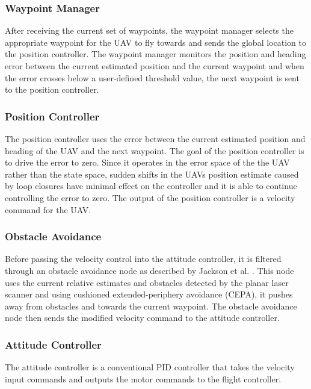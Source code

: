 \documentclass[letterpaper, 10 pt, conference]{ieeeconf}  %
\begin{document}
\subsubsection{Waypoint Manager}

After receiving the current set of waypoints, the waypoint manager selects the appropriate waypoint for the UAV to fly towards and sends the global location to the position controller. The waypoint manager monitors the position and heading error between the current estimated position and the current waypoint and when the error crosses below a user-defined threshold value, the next waypoint is sent to the position controller.

\subsubsection{Position Controller}

The position controller uses the error between the current estimated position and heading of the UAV and the next waypoint. The goal of the position controller is to drive the error to zero. Since it operates in the error space of the the UAV rather than the state space, sudden shifts in the UAVs position estimate caused by loop closures have minimal effect on the controller and it is able to continue controlling the error to zero. The output of the position controller is a velocity command for the UAV.

\subsubsection{Obstacle Avoidance} \label{obs_avoid}

Before passing the velocity control into the attitude controller, it is filtered through an obstacle avoidance node as described by Jackson et al. \cite{Jackson2016}. This node uses the current relative estimates and obstacles detected by the planar laser scanner and using cushioned extended-periphery avoidance (CEPA), it pushes away from obstacles and towards the current waypoint. The obstacle avoidance node then sends the modified velocity command to the attitude controller.

\subsubsection{Attitude Controller}

The attitude controller is a conventional PID controller that takes the velocity input commands and outputs the motor commands to the flight controller.
\end{document}

